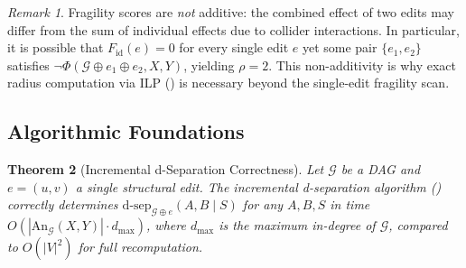 \documentclass[11pt,a4paper]{article}
\newtheorem{theorem}{Theorem}[section]
\theoremstyle{definition}
\theoremstyle{remark}
\newtheorem{remark}[theorem]{Remark}
\newcommand{\DAG}{\mathcal{G}}
\newcommand{\An}{\mathrm{An}}
\newcommand{\dsep}{\mathrm{d\text{-}sep}}
\newcommand{\fragility}{F}
\newcommand{\radius}{\rho}
\newcommand{\Phi}{\varPhi}
\begin{document}
\begin{remark}\label{rem:fragility_nonadditive}
Fragility scores are \emph{not} additive: the combined effect of two edits may differ
from the sum of individual effects due to collider interactions. In particular, it is
possible that $\fragility_{\mathrm{id}}(e) = 0$ for every single edit $e$ yet some pair
$\{e_1, e_2\}$ satisfies $\neg\Phi(\DAG \oplus e_1 \oplus e_2, X, Y)$, yielding
$\radius = 2$. This non-additivity is why exact radius computation via ILP
() is necessary beyond the single-edit fragility scan.
\end{remark}

\subsection{Algorithmic Foundations}

\begin{theorem}[Incremental d-Separation Correctness]\label{thm:incremental_dsep}
Let $\DAG$ be a DAG and $e = (u, v)$ a single structural edit. The incremental
d-separation algorithm () correctly determines
$\dsep_{\DAG \oplus e}(A, B \mid S)$ for any $A, B, S$ in time
$O(|\An_\DAG(X,Y)| \cdot d_{\max})$, where $d_{\max}$ is the maximum in-degree of
$\DAG$, compared to $O(|V|^2)$ for full recomputation.
\end{theorem}
\end{document}
